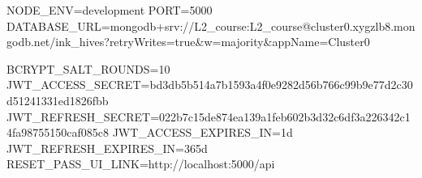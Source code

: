 NODE_ENV=development
PORT=5000
DATABASE_URL=mongodb+srv://L2_course:L2_course@cluster0.xygzlb8.mongodb.net/ink_hives?retryWrites=true&w=majority&appName=Cluster0

BCRYPT_SALT_ROUNDS=10
JWT_ACCESS_SECRET=bd3db5b514a7b1593a4f0e9282d56b766c99b9e77d2c30d51241331ed1826fbb
JWT_REFRESH_SECRET=022b7c15de874ea139a1feb602b3d32c6df3a226342c14fa98755150caf085c8
JWT_ACCESS_EXPIRES_IN=1d
JWT_REFRESH_EXPIRES_IN=365d
RESET_PASS_UI_LINK=http://localhost:5000/api